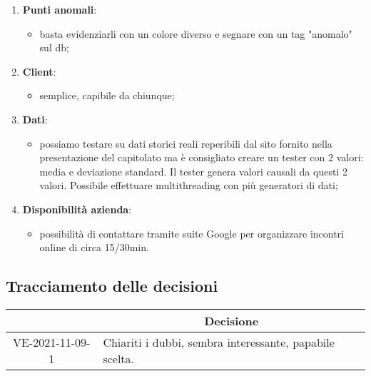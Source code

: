 \begin{enumerate}
\begin{itemize}
		\end{itemize}
	\item \textbf{Punti anomali}:
		\begin{itemize}
			\item basta evidenziarli con un colore diverso e segnare con un tag "anomalo" sul db;
		\end{itemize}
	\item \textbf{Client}:
		\begin{itemize}
			\item semplice, capibile da chiunque;
		\end{itemize}
	\item \textbf{Dati}:
		\begin{itemize}
			\item possiamo testare su dati storici reali reperibili dal sito fornito nella presentazione del capitolato ma è consigliato creare un tester con 2 valori: media e deviazione standard. Il tester genera valori causali da questi 2 valori. Possibile effettuare multithreading con più generatori di dati;
		\end{itemize}
	\item \textbf{Disponibilità azienda}:
		\begin{itemize}
			\item possibilità di contattare tramite suite Google per organizzare incontri online di circa 15/30min.
		\end{itemize}
\end{enumerate}

\pagebreak

\subsection{Tracciamento delle decisioni}

\begin{table}[H]
	\centering
	\renewcommand{\arraystretch}{1.8}
	\begin{tabular}{c | p{10cm}}
		\rowcolor[HTML]{125E28}
		\multicolumn{1}{c}{\color[HTML]{FFFFFF} \textbf{ID}} &
		\multicolumn{1}{c}{\color[HTML]{FFFFFF} \textbf{Decisione}} \\
		\hline
		VE-2021-11-09-1 & Chiariti i dubbi, sembra interessante, papabile scelta. \\
	\end{tabular}
\end{table}
